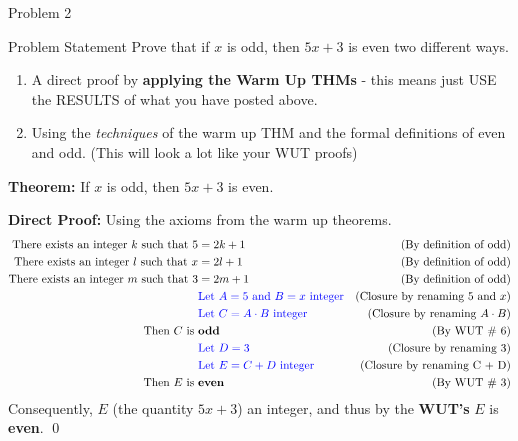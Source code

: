 \begin{problem}{Problem 2}
    \begin{statement}{Problem Statement}
        Prove that if $x$ is odd, then $5x + 3$ is even two different ways.

        \begin{enumerate}[label=(\alph*)]
            \item A direct proof by \textbf{applying the Warm Up THMs} - this means just USE the RESULTS of what you have posted above.
            \item Using the \textit{techniques} of the warm up THM and the formal definitions of even and odd. (This will look a lot like your WUT proofs)
        \end{enumerate}
    \end{statement}

    \begin{highlight}
        \textbf{Theorem:} If $x$ is odd, then $5x + 3$ is even. \vspace*{1em}

        \textbf{Direct Proof:} Using the axioms from the warm up theorems. \newline
        \begin{align*}
            \text{There exists an integer $k$ such that } 5 & = 2k + 1 & \text{(By definition of odd)} \\
            \text{There exists an integer $l$ such that } x & = 2l + 1 & \text{(By definition of odd)} \\
            \text{There exists an integer $m$ such that } 3 & = 2m + 1 & \text{(By definition of odd)} \\
            & \textcolor{blue}{\text{Let } A = 5 \text { and } B = x \text{ integer}} & \text{(Closure by renaming $5$ and $x$)} \\
            & \textcolor{blue}{\text{Let } C = A \cdot B \text{ integer}} & \text{(Closure by renaming $A \cdot B$)} \\
            \text{Then $C$ is } & \text{\textbf{odd}} & \text{(By WUT \# 6)} \\
            & \textcolor{blue}{\text{Let } D = 3} & \text{(Closure by renaming $3$)} \\
            & \textcolor{blue}{\text{Let } E = C + D \text{ integer}} & \text{(Closure by renaming C + D)} \\
            \text{Then $E$ is } & \text{\textbf{even}} & \text{(By WUT \# 3)} \\
        \end{align*}
        Consequently, $E$ (the quantity $5x + 3$) an integer, and thus by the \textbf{WUT's} $E$ is \textbf{even}. \qed
    \end{highlight}


\end{problem}
